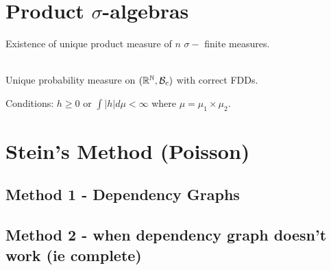 \documentclass{article}
\begin{document}
\section{Product $\sigma$-algebras}
Existence of unique product measure of $n$ $\sigma-$ finite measures. \\\\

\begin{theorem}
Unique probability measure on $(\mathbb R^\mathbb N, \mathcal B_c)$ with correct FDDs. 
\end{theorem}



\begin{theorem}[Fubini's]
Conditions: $h\geq0$ or $\int |h| d\mu <\infty $ where $\mu = \mu_1 \times \mu_2$. 
\end{theorem}
\section{Stein's Method (Poisson)}




\subsection{Method 1 - Dependency Graphs}

\subsection{Method 2 - when dependency graph doesn't work (ie complete)}
\end{document}
